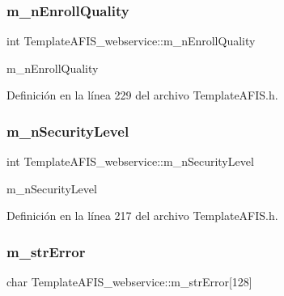 \subsubsection{\texorpdfstring{m\+\_\+n\+Enroll\+Quality}{m\_nEnrollQuality}}
{\footnotesize\ttfamily int Template\+A\+F\+I\+S\+\_\+webservice\+::m\+\_\+n\+Enroll\+Quality\hspace{0.3cm}{\ttfamily [private]}}



m\+\_\+n\+Enroll\+Quality 



Definición en la línea 229 del archivo Template\+A\+F\+I\+S.\+h.

\hypertarget{classTemplateAFIS__webservice_a8809dc8920da337f97252597ef492671}{}\label{classTemplateAFIS__webservice_a8809dc8920da337f97252597ef492671} 
\subsubsection{\texorpdfstring{m\+\_\+n\+Security\+Level}{m\_nSecurityLevel}}
{\footnotesize\ttfamily int Template\+A\+F\+I\+S\+\_\+webservice\+::m\+\_\+n\+Security\+Level\hspace{0.3cm}{\ttfamily [private]}}



m\+\_\+n\+Security\+Level 



Definición en la línea 217 del archivo Template\+A\+F\+I\+S.\+h.

\hypertarget{classTemplateAFIS__webservice_a83ff03441c588729601736d18eb65afd}{}\label{classTemplateAFIS__webservice_a83ff03441c588729601736d18eb65afd} 
\subsubsection{\texorpdfstring{m\+\_\+str\+Error}{m\_strError}}
{\footnotesize\ttfamily char Template\+A\+F\+I\+S\+\_\+webservice\+::m\+\_\+str\+Error\mbox{[}128\mbox{]}\hspace{0.3cm}{\ttfamily [private]}}



